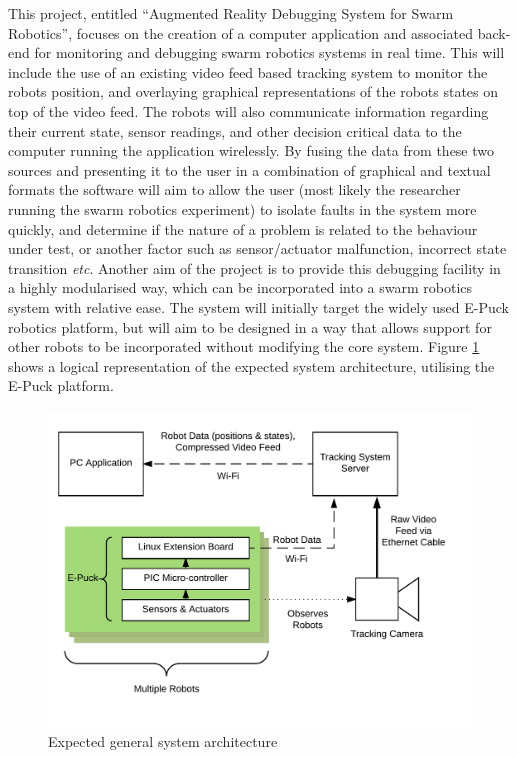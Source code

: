 \documentclass[titlepage,hidelinks,10pt]{article}
\begin{document}
\begin{multicols}{2}
This project, entitled ``Augmented Reality Debugging System for Swarm Robotics'', focuses on the creation of a computer application and associated back-end for monitoring and debugging swarm robotics systems in real time. This will include the use of an existing video feed based tracking system to monitor the robots position, and overlaying graphical representations of the robots states on top of the video feed. The robots will also communicate information regarding their current state, sensor readings, and other decision critical data to the computer running the application wirelessly. By fusing the data from these two sources and presenting it to the user in a combination of graphical and textual formats the software will aim to allow the user (most likely the researcher running the swarm robotics experiment) to isolate faults in the system more quickly, and determine if the nature of a problem is related to the behaviour under test, or another factor such as sensor/actuator malfunction, incorrect state transition \textit{etc}. Another aim of the project is to provide this debugging facility in a highly modularised way, which can be incorporated into a swarm robotics system with relative ease. The system will initially target the widely used E-Puck\cite{epuck} robotics platform, but will aim to be designed in a way that allows support for other robots to be incorporated without modifying the core system. Figure \ref{fig:SystemArchitecture} shows a logical representation of the expected system architecture, utilising the E-Puck platform. 
\end{multicols}

\begin{figure}[H]
	\begin{center}
	\includegraphics[scale=1.0]{SystemArchitecture.png}
	\caption{Expected general system architecture}
	\label{fig:SystemArchitecture}
	\end{center}
\end{figure}
\end{document}
